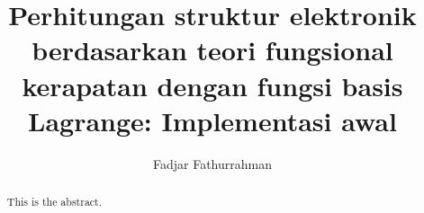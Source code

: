\documentclass[%
reprint,
amsmath,
amssymb,
aps,
]{revtex4-1}
\begin{document}
\title{Perhitungan struktur elektronik berdasarkan teori fungsional
    kerapatan dengan fungsi basis Lagrange: Implementasi awal}
\author{Fadjar Fathurrahman}

\begin{abstract}
This is the abstract.
\end{abstract}

\maketitle








\end{document}
